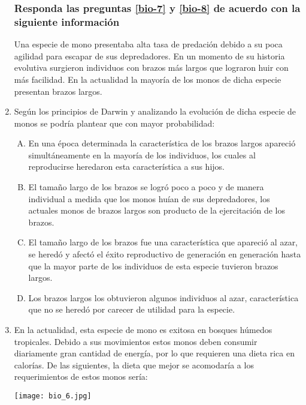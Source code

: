 \begin{enumerate}
\newpage
\subsubsection*{Responda las preguntas \ref{bio-7} y \ref{bio-8} de acuerdo con la siguiente información}
Una especie de mono presentaba alta tasa de predación debido a su poca agilidad para escapar de sus depredadores. En un momento de su historia evolutiva surgieron individuos con brazos más largos que lograron huir con más facilidad. En la actualidad la mayoría de los monos de dicha especie presentan brazos largos.


\item  Según los principios de Darwin y analizando la evolución de dicha especie de monos se podría plantear que con mayor probabilidad: \label{bio-7}

\begin{enumerate}[(A)]
\item En una época determinada la característica de los brazos largos apareció simultáneamente en la mayoría de los individuos, los cuales al reproducirse heredaron esta característica a sus hijos.
\item El tamaño largo de los brazos se logró poco a poco y de manera individual a medida que los monos huían de sus depredadores, los actuales monos de brazos largos son producto de la ejercitación de los brazos.
\item El tamaño largo de los brazos fue una característica que apareció al azar, se heredó y afectó el éxito reproductivo de generación en generación hasta que la mayor parte de los individuos de esta especie tuvieron brazos largos.
\item Los brazos largos los obtuvieron algunos individuos al azar, característica que no se heredó por carecer de utilidad para la especie.
\end{enumerate}

\newpage
\item En la actualidad, esta especie de mono es exitosa en bosques húmedos tropicales. Debido a sus movimientos estos monos deben consumir diariamente gran cantidad de energía, por lo que requieren una dieta rica en calorías. De las siguientes, la dieta que mejor se acomodaría a los requerimientos de estos monos sería: \label{bio-8}

\begin{center}
\texttt{[image: bio\_6.jpg]} 
\end{center}



\end{enumerate}
